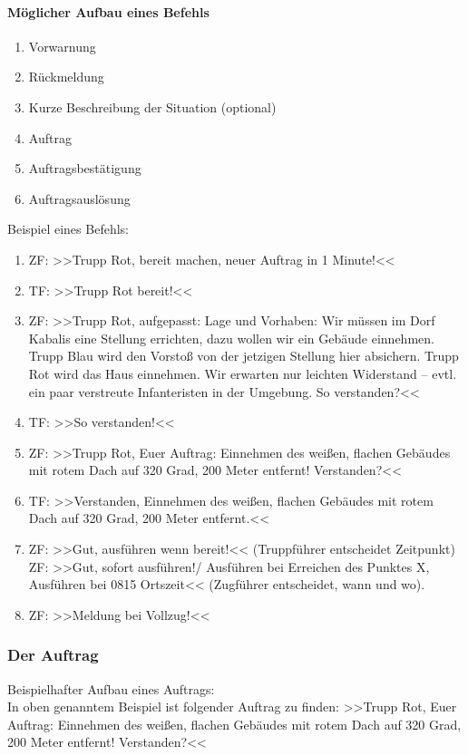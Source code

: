 \paragraph*{Möglicher Aufbau eines Befehls}
\begin{enumerate}
	\item Vorwarnung
	\item Rückmeldung
	\item Kurze Beschreibung der Situation (optional)
	\item Auftrag
	\item Auftragsbestätigung
	\item Auftragsauslösung
\end{enumerate}

Beispiel eines Befehls:
\begin{enumerate}
	\item ZF: >>Trupp Rot, bereit machen, neuer Auftrag in 1 Minute!<<
	\item TF: >>Trupp Rot bereit!<<
	\item ZF: >>Trupp Rot, aufgepasst: Lage und Vorhaben: Wir müssen im Dorf Kabalis eine Stellung errichten, dazu wollen wir ein Gebäude einnehmen. Trupp Blau wird den Vorstoß von der jetzigen Stellung hier absichern. Trupp Rot wird das Haus einnehmen. Wir erwarten nur leichten Widerstand -- evtl. ein paar verstreute Infanteristen in der Umgebung. So verstanden?<<
	\item TF: >>So verstanden!<<
	\item ZF: >>Trupp Rot, Euer Auftrag: Einnehmen des weißen, flachen Gebäudes mit rotem Dach auf 320 Grad, 200 Meter entfernt! Verstanden?<<
	\item TF: >>Verstanden, Einnehmen des weißen, flachen Gebäudes mit rotem Dach auf 320 Grad, 200 Meter entfernt.<<
	\item ZF: >>Gut, ausführen wenn bereit!<< (Truppführer entscheidet Zeitpunkt)\\ 
		ZF: >>Gut, sofort ausführen!/ Ausführen bei Erreichen des Punktes X, Ausführen bei 0815 Ortszeit<< (Zugführer entscheidet, wann und wo).
	\item ZF: >>Meldung bei Vollzug!<<
\end{enumerate}

\subsubsection{Der Auftrag}
Beispielhafter Aufbau eines Auftrags:\\
In oben genanntem Beispiel ist folgender Auftrag zu finden:
>>Trupp Rot, Euer Auftrag: Einnehmen des weißen, flachen Gebäudes mit rotem Dach auf 320 Grad, 200 Meter entfernt! Verstanden?<<

